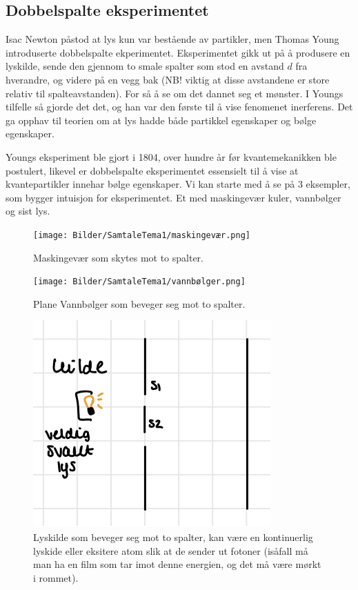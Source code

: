 \subsection{Dobbelspalte eksperimentet}
\label{sec:tema1_9}
Isac Newton påstod at lys kun var bestående av partikler, men Thomas Young introduserte dobbelspalte ekperimentet. Eksperimentet gikk ut på å produsere en lyskilde, sende den gjennom to smale spalter som stod en avstand $d$ fra hverandre, og videre på en vegg bak (NB! viktig at disse avstandene er store relativ til spalteavstanden). For så å se om det dannet seg et mønster. I Youngs tilfelle så gjorde det det, og han var den første til å vise fenomenet inerferens. Det ga opphav til teorien om at lys hadde både partikkel egenskaper og bølge egenskaper.

Youngs eksperiment ble gjort i 1804, over hundre år før kvantemekanikken ble postulert, likevel er dobbelspalte eksperimentet essensielt til å vise at kvantepartikler innehar bølge egenskaper. Vi kan starte med å se på 3 eksempler, som bygger intuisjon for eksperimentet. Et med maskingevær kuler, vannbølger og sist lys.

\begin{figure}[!htb]
    \centering
    \texttt{[image: Bilder/SamtaleTema1/maskingevær.png]}
    \caption{Maskingevær som skytes mot to spalter.}
    \label{fig:Maskingevær}
\end{figure}

\begin{figure}[!htb]
    \centering
    \texttt{[image: Bilder/SamtaleTema1/vannbølger.png]}
    \caption{Plane Vannbølger som beveger seg mot to spalter.}
    \label{fig:vannbølger}
\end{figure}

\begin{figure}
    \centering
    \includegraphics{Bilder/SamtaleTema1/lyskilde.png}
    \caption{Lyskilde som beveger seg mot to spalter, kan være en kontinuerlig lyskide eller eksitere atom slik at de sender ut fotoner (isåfall må man ha en film som tar imot denne energien, og det må være mørkt i rommet).}
    \label{fig:enter-label}
\end{figure}

